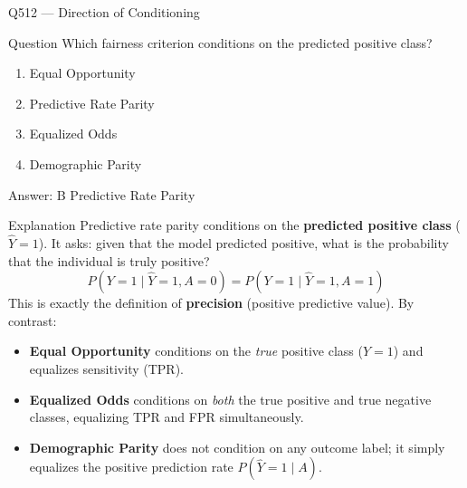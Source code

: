 \documentclass[aspectratio=169,8pt]{beamer}
\begin{document}
\begin{frame}{Q512 --- Direction of Conditioning}
	\begin{block}{Question}
		Which fairness criterion conditions on the predicted positive class?
		\begin{enumerate}
			\item Equal Opportunity
			\item Predictive Rate Parity
			\item Equalized Odds
			\item Demographic Parity
		\end{enumerate}
	\end{block}
	\begin{exampleblock}{Answer: B}
		Predictive Rate Parity
	\end{exampleblock}
	\begin{block}{Explanation}
		Predictive rate parity conditions on the \textbf{predicted positive class}
		(\(\hat{Y} = 1\)). It asks: given that the model predicted positive,
		what is the probability that the individual is truly positive?
		\[
		P(Y = 1 \mid \hat{Y} = 1, A = 0) = P(Y = 1 \mid \hat{Y} = 1, A = 1)
		\]
		This is exactly the definition of \textbf{precision} (positive predictive value).
		By contrast:
		\begin{itemize}
			\item \textbf{Equal Opportunity} conditions on the \emph{true} positive class
			(\(Y = 1\)) and equalizes sensitivity (TPR).
			\item \textbf{Equalized Odds} conditions on \emph{both} the true positive and
			true negative classes, equalizing TPR and FPR simultaneously.
			\item \textbf{Demographic Parity} does not condition on any outcome label;
			it simply equalizes the positive prediction rate \(P(\hat{Y} = 1 \mid A)\).
		\end{itemize}
	\end{block}
\end{frame}
\end{document}
